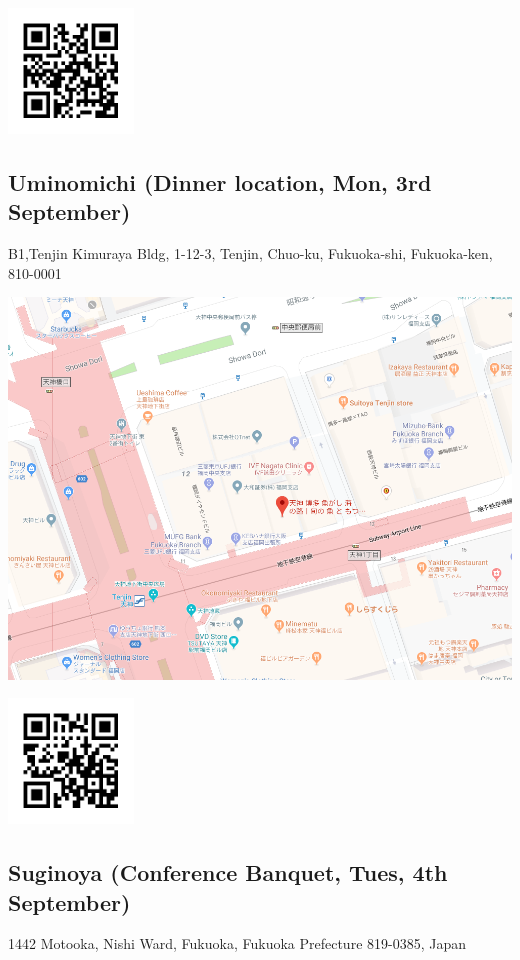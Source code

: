 \includegraphics[width=0.25\textwidth]{google_map01_qr.png}

\newpage
\subsection*{Uminomichi (Dinner location, Mon, 3rd September)}
B1,Tenjin Kimuraya Bldg, 1-12-3, Tenjin, Chuo-ku, Fukuoka-shi, Fukuoka-ken, 810-0001

\noindent\includegraphics[width=\textwidth]{uminomichi.png}

\includegraphics[width=0.25\textwidth]{uminomichi_qr.png}


\newpage
\subsection*{Suginoya (Conference Banquet, Tues, 4th September)}
1442 Motooka, Nishi Ward, Fukuoka, Fukuoka Prefecture 819-0385, Japan

